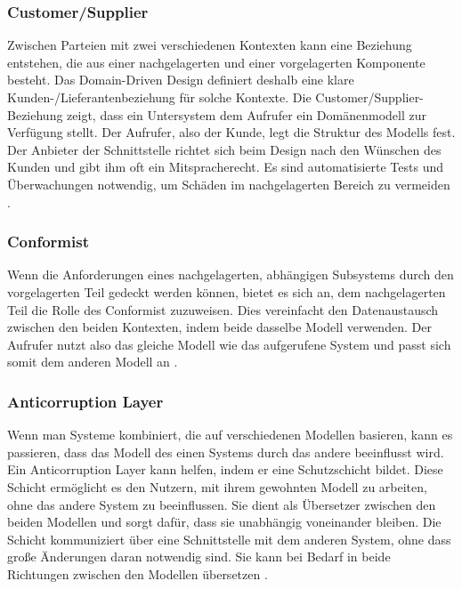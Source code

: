 {\subsubsection{Customer/Supplier}

Zwischen Parteien mit zwei verschiedenen Kontexten kann eine Beziehung entstehen, die aus einer nachgelagerten und einer vorgelagerten Komponente besteht. Das Domain-Driven Design definiert deshalb eine klare Kunden-/Lieferantenbeziehung für solche Kontexte. Die \glqq Customer/Supplier\grqq{}-Beziehung zeigt, dass ein Untersystem dem Aufrufer ein Domänenmodell zur Verfügung stellt. Der Aufrufer, also der Kunde, legt die Struktur des Modells fest. Der Anbieter der Schnittstelle richtet sich beim Design nach den Wünschen des Kunden und gibt ihm oft ein Mitspracherecht. Es sind automatisierte Tests und Überwachungen notwendig, um Schäden im nachgelagerten Bereich zu vermeiden \cite[S. 356 - 360]{evans} \cite[S. 45,47]{wolff} \cite[S.66]{dowalil}.

\subsubsection{Conformist}

Wenn die Anforderungen eines nachgelagerten, abhängigen Subsystems durch den vorgelagerten Teil gedeckt werden können, bietet es sich an, dem nachgelagerten Teil die Rolle des \glqq Conformist\grqq{} zuzuweisen. Dies vereinfacht den Datenaustausch zwischen den beiden Kontexten, indem beide dasselbe Modell verwenden. Der Aufrufer nutzt also das gleiche Modell wie das aufgerufene System und passt sich somit dem anderen Modell an \cite[S. 361 - 363]{evans} \cite[S. 47]{wolff} \cite[S.66]{dowalil}.

\subsubsection{Anticorruption Layer}

Wenn man Systeme kombiniert, die auf verschiedenen Modellen basieren, kann es passieren, dass das Modell des einen Systems durch das andere beeinflusst wird. Ein \glqq Anticorruption Layer\grqq{} kann helfen, indem er eine Schutzschicht bildet. Diese Schicht ermöglicht es den Nutzern, mit ihrem gewohnten Modell zu arbeiten, ohne das andere System zu beeinflussen. Sie dient als Übersetzer zwischen den beiden Modellen und sorgt dafür, dass sie unabhängig voneinander bleiben. Die Schicht kommuniziert über eine Schnittstelle mit dem anderen System, ohne dass große Änderungen daran notwendig sind. Sie kann bei Bedarf in beide Richtungen zwischen den Modellen übersetzen \cite[S. 364 - 370]{evans} \cite[S. 47]{wolff} \cite[S.66]{dowalil}.

}
